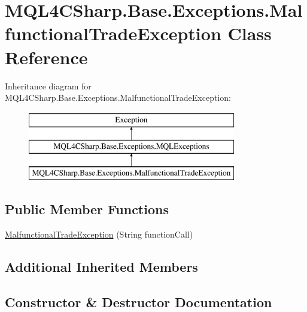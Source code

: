 \hypertarget{class_m_q_l4_c_sharp_1_1_base_1_1_exceptions_1_1_malfunctional_trade_exception}{}\section{M\+Q\+L4\+C\+Sharp.\+Base.\+Exceptions.\+Malfunctional\+Trade\+Exception Class Reference}
\label{class_m_q_l4_c_sharp_1_1_base_1_1_exceptions_1_1_malfunctional_trade_exception}
Inheritance diagram for M\+Q\+L4\+C\+Sharp.\+Base.\+Exceptions.\+Malfunctional\+Trade\+Exception\+:\begin{figure}[H]
\begin{center}
\leavevmode
\includegraphics[height=3.000000cm]{class_m_q_l4_c_sharp_1_1_base_1_1_exceptions_1_1_malfunctional_trade_exception}
\end{center}
\end{figure}
\subsection*{Public Member Functions}
\begin{DoxyCompactItemize}
\item 
\hyperlink{class_m_q_l4_c_sharp_1_1_base_1_1_exceptions_1_1_malfunctional_trade_exception_aaba56081b44c3d85cd9f6d494f92dc92}{Malfunctional\+Trade\+Exception} (String function\+Call)
\end{DoxyCompactItemize}
\subsection*{Additional Inherited Members}


\subsection{Constructor \& Destructor Documentation}

